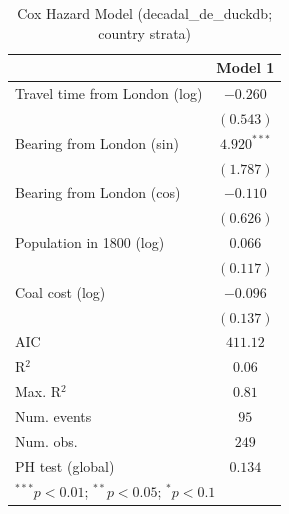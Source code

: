 
\begin{table}
\begin{center}
\begin{tabular}{l c}
\hline
 & Model 1 \\
\hline
Travel time from London (log) & $-0.260$ \\
 & $(0.543)$ \\
Bearing from London (sin) & $4.920^{***}$ \\
 & $(1.787)$ \\
Bearing from London (cos) & $-0.110$ \\
 & $(0.626)$ \\
Population in 1800 (log) & $0.066$ \\
 & $(0.117)$ \\
Coal cost (log) & $-0.096$ \\
 & $(0.137)$ \\
\hline
AIC              & $411.12$ \\
R$^2$            & $0.06$ \\
Max. R$^2$       & $0.81$ \\
Num. events      & $95$ \\
Num. obs.        & $249$ \\
PH test (global) & $0.134$ \\
\hline
\multicolumn{2}{l}{\scriptsize{$^{***}p<0.01$; $^{**}p<0.05$; $^{*}p<0.1$}}
\end{tabular}
\caption{Cox Hazard Model (decadal\_de\_duckdb; country strata)}
\label{tab:cox_serious_strata_decadal_de_duckdb}
\end{center}
\end{table}
